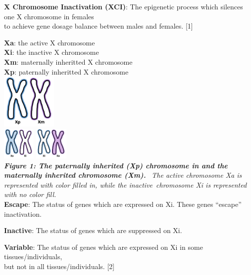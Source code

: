 \documentclass[
]{article}
\author{}
\date{\vspace{-2.5em}}
\begin{document}
\textbf{X Chromosome Inactivation (XCI)}: The epigenetic process which
silences one X chromosome in females\\
to achieve gene dosage balance between males and females. {[}1{]}

\textbf{Xa}: the active X chromosome\\

\textbf{Xi}: the inactive X chromosome\\

\textbf{Xm}: maternally inheritted X chromosome\\

\textbf{Xp}: paternally inheritted X chromosome\\

\includegraphics[width=0.2\textwidth,height=\textheight]{images/XCI-images/Slide2.png}\\
\includegraphics[width=0.12\textwidth,height=\textheight]{images/XCI-images/Slide3.png}
\includegraphics[width=0.12\textwidth,height=\textheight]{images/XCI-images/Slide4.png}\\

\textbf{\emph{Figure 1: The paternally inherited (Xp) chromosome in and
the maternally inherited chromosome (Xm).}}~ \emph{The active chromosome
Xa is represented with color filled in, while the
inactive}~\emph{chromosome Xi is represented with no color fill.}\\

\textbf{Escape}: The status of genes which are expressed on Xi. These
genes ``escape'' inactivation.

\textbf{Inactive}: The status of genes which are suppressed on Xi.

\textbf{Variable}: The status of genes which are expressed on Xi in some
tissues/individuals,\\
but not in all tissues/individuals. {[}2{]}
\end{document}
